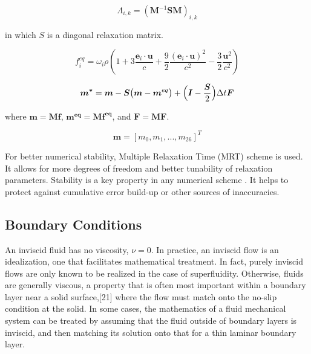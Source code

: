 \begin{equation}
	\label{eq:collision-operator}
	\Lambda_{i,k} = (\bm{M}^{-1}\bm{SM})_{i,k}
\end{equation}

in which $S$ is a diagonal relaxation matrix.

\begin{equation}
	\label{eq:feq}
	f_i^{eq} = \omega_i \rho \left( 1+3\frac{\bm{e}_i \cdot \bm{u}}{c} + \frac{9}{2}\frac{(\bm{e}_i \cdot \bm{u})^2}{c^2}-\frac{3}{2}\frac{\bm{u}^2}{c^2}\right)
\end{equation}


\begin{equation}
	\label{eq:collision-moment-space}
	\small
	\bm{m^*}=\bm{m}-\bm{S}\big(\bm{m}-\bm{m}^{eq}\big)+\Big(\bm{I}-\frac{\bm{S}}{2}\Big)\Delta t\bm{F}
\end{equation}

where $\bm{m}=\bm{Mf}$, $\bm{m^{eq}}=\bm{Mf^{eq}}$, and $\bm{F}=\bm{MF}$.


\begin{equation}
	\label{eq:moments}
	\bm{m} = [m_0, m_1,...,m_{26}]^T
\end{equation}

For better numerical stability, Multiple Relaxation Time (MRT) scheme is used. It allows for more degrees of freedom and better tunability of relaxation parameters. Stability is a key property in any numerical scheme \cite{succi2001lattice}. It helps to protect against cumulative error build-up or other sources of inaccuracies.


\subsection{Boundary Conditions}



An inviscid fluid has no viscosity, $\nu = 0$. In practice, an inviscid flow is an idealization, one that facilitates mathematical treatment. In fact, purely inviscid flows are only known to be realized in the case of superfluidity. Otherwise, fluids are generally viscous, a property that is often most important within a boundary layer near a solid surface,[21] where the flow must match onto the no-slip condition at the solid. In some cases, the mathematics of a fluid mechanical system can be treated by assuming that the fluid outside of boundary layers is inviscid, and then matching its solution onto that for a thin laminar boundary layer.

